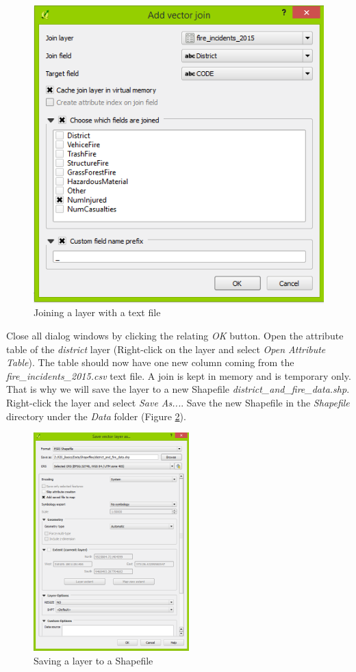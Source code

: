 \documentclass[a4paper,12pt,titlepage]{article}
\begin{document}
\begin{figure}[h]
\centering
\includegraphics[width=12cm]{Images/join.png}
\caption{Joining a layer with a text file}\label{fig:join}
\end{figure}

Close all dialog windows by clicking the relating \textit{OK} button. Open the attribute table of the \textit{district} layer (Right-click on the layer and select \textit{Open Attribute Table}). The table should now have one new column coming from the \textit{fire\_incidents\_2015.csv} text file. A join is kept in memory and is temporary only. That is why we will save the layer to a new Shapefile \textit{district\_and\_fire\_data.shp}. Right-click the layer and select \textit{Save As...}. Save the new Shapefile in the \textit{Shapefile} directory under the \textit{Data} folder (Figure \ref{fig:save_to_shapefile}).

\begin{figure}[h]
\centering
\includegraphics[width=6cm]{Images/save_to_shapefile.png}
\caption{Saving a layer to a Shapefile}\label{fig:save_to_shapefile}
\end{figure}
\end{document}
